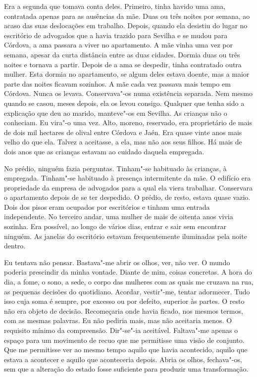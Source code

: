 Era a segunda que tomava conta deles. Primeiro, tinha havido uma ama,
contratada apenas para as ausências da mãe. Duas ou três noites por
semana, ao acaso das suas deslocações em trabalho. Depois, quando ela
desistiu do lugar no escritório de advogados que a havia trazido para
Sevilha e se mudou para Córdova, a ama passara a viver no apartamento. A
mãe vinha uma vez por semana, apesar da curta distância entre as duas
cidades. Dormia duas ou três noites e tornava a partir. Depois de a ama
se despedir, tinha contratado outra mulher. Esta dormia no apartamento,
se algum deles estava doente, mas a maior parte das noites ficavam
sozinhos. A mãe cada vez passava mais tempo em Córdova. Nunca os levava.
Conservava"-os numa existência separada. Nem mesmo quando se casou,
meses depois, ela os levou consigo. Qualquer que tenha sido a explicação
que deu ao marido, manteve"-os em Sevilha. As crianças não o conheciam.
Eu vira"-o uma vez. Alto, moreno, reservado, era proprietário de mais de
dois mil hectares de olival entre Córdova e Jaén. Era quase vinte anos
mais velho do que ela. Talvez a aceitasse, a ela, mas não aos seus
filhos. Há mais de dois anos que as crianças estavam ao cuidado daquela
empregada.

No prédio, ninguém fazia perguntas. Tinham"-se habituado às crianças, à
empregada. Tinham"-se habituado à presença intermitente da mãe. O
edifício era propriedade da empresa de advogados para a qual ela viera
trabalhar. Conservara o apartamento depois de se ter despedido. O
prédio, de resto, estava quase vazio. Dois dos pisos eram ocupados por
escritórios e tinham uma entrada independente. No terceiro andar, uma
mulher de mais de oitenta anos vivia sozinha. Era possível, ao longo de
vários dias, entrar e sair sem encontrar ninguém. As janelas do
escritório estavam frequentemente iluminadas pela noite dentro.

Eu tentava não pensar. Bastava"-me abrir os olhos, ver, não ver.
O mundo poderia prescindir da minha vontade. Diante de mim, coisas
concretas. A hora do dia, a fome, o sono, a sede, o corpo das mulheres
com as quais me cruzava na rua, as pequenas decisões do quotidiano.
Acordar, vestir"-me, tentar adormecer. Tudo isso cuja soma é sempre, por
excesso ou por defeito, superior às partes. O resto não era objeto de
decisão. Recomeçaria onde havia ficado, nos mesmos termos, com as mesmas
palavras. Eu não pediria mais, mas não aceitaria menos. O requisito
mínimo da compreensão. Dir"-se"-ia aceitável. Faltava"-me apenas o
espaço para um movimento de recuo que me permitisse uma visão de
conjunto. Que me permitisse ver ao mesmo tempo aquilo que havia
acontecido, aquilo que estava a acontecer e aquilo que aconteceria
depois. Abria os olhos, fechava"-os, sem que a alteração do estado fosse
suficiente para produzir uma transformação.

